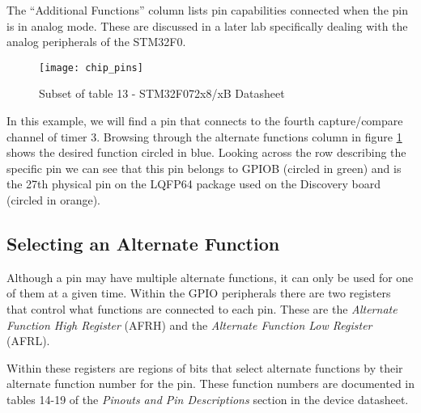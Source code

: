 \documentclass[11pt,fleqn]{book} %
\begin{document}
    The ``Additional Functions'' column lists pin capabilities connected when the pin is in analog mode. These are discussed in a later lab specifically dealing with the analog peripherals of the STM32F0.


%    
    \begin{figure}[]
        \centering\texttt{[image: chip\_pins]}
        \caption{Subset of table 13 - STM32F072x8/xB Datasheet}
        \label{chip_pins}
    \end{figure}

    \begin{example}
            In this example, we will find a pin that connects to the fourth capture/compare channel of timer 3. Browsing through the alternate functions column in figure \ref{chip_pins} shows the desired function circled in blue. Looking across the row describing the specific pin we can see that this pin belongs to GPIOB (circled in green) and is the 27th physical pin on the LQFP64 package used on the Discovery board (circled in orange).
        
    \end{example}
    
    \subsection{Selecting an Alternate Function}
    Although a pin may have multiple alternate functions, it can only be used for one of them at a given time. Within the GPIO peripherals there are two registers that control what functions are connected to each pin. These are the \textit{Alternate Function High Register} (AFRH) and the  \textit{Alternate Function Low Register} (AFRL). 
    
    Within these registers are regions of bits that select alternate functions by their alternate function number for the pin. These function numbers are documented in tables 14-19 of the \textit{Pinouts and Pin Descriptions} section in the device datasheet. 
%    
\end{document}
